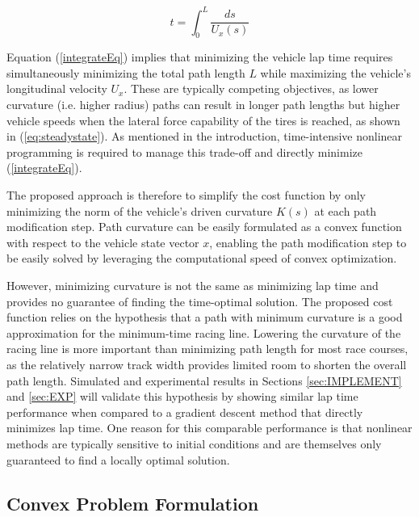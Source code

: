 \documentclass[twocolumn,10pt]{asme2ej}
\begin{document}
 \begin{equation}
t = \int_0^L\frac{ds}{U_x(s)}
\label{integrateEq}
\end{equation}
 
 Equation (\ref{integrateEq}) implies that minimizing the vehicle lap time requires simultaneously minimizing the total path length $L$ while maximizing
 the vehicle's longitudinal velocity $U_x$. These are typically competing objectives, as lower curvature (i.e. higher radius) paths can result in longer path lengths but higher
 vehicle speeds when the lateral force capability of the tires is reached, as shown in (\ref{eq:steadystate}). As mentioned in the introduction, time-intensive nonlinear programming
 is required to manage this trade-off and directly minimize (\ref{integrateEq}). 
 
 The proposed approach is therefore to simplify the cost function by only minimizing the norm of the vehicle's driven curvature
 $K(s)$ at each path modification step. Path curvature can be easily formulated as a convex function with respect to the vehicle state vector $x$, 
 enabling the path modification step to be easily solved by leveraging the computational speed of convex optimization. 
 
 However, minimizing curvature is not the same as minimizing lap time and provides
 no guarantee of finding the time-optimal solution. The proposed cost function relies on the hypothesis that a path with minimum curvature is a good approximation for
 the minimum-time racing line. Lowering the curvature of the racing line is more important than minimizing
 path length for most race courses, as the relatively narrow track width provides limited room to shorten the overall path length. Simulated and experimental results
 in Sections \ref{sec:IMPLEMENT} and \ref{sec:EXP} will validate this hypothesis by showing similar lap time performance when compared to
 a gradient descent method that directly minimizes lap time. One reason for this comparable performance is that nonlinear methods are
 typically sensitive to initial conditions and are themselves only guaranteed to find a locally optimal solution.  

\subsection{Convex Problem Formulation}
\end{document}
